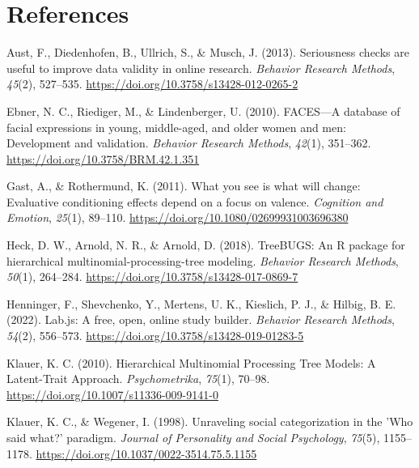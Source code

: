 \documentclass[
  doc,floatsintext]{apa6}
\newlength{\cslhangindent}
\newenvironment{CSLReferences}[2] %
 {\begin{list}{}{%
  \setlength{\itemindent}{0pt}
  \setlength{\leftmargin}{0pt}
  \setlength{\parsep}{0pt}
  \ifodd #1
   \setlength{\leftmargin}{\cslhangindent}
   \setlength{\itemindent}{-1\cslhangindent}
  \fi
  \setlength{\itemsep}{#2\baselineskip}}}
 {\end{list}}
\begin{document}
\section{References}\label{references}

\label{refs}
\begin{CSLReferences}{1}{0}
Aust, F., Diedenhofen, B., Ullrich, S., \& Musch, J. (2013). Seriousness checks are useful to improve data validity in online research. \emph{Behavior Research Methods}, \emph{45}(2), 527--535. \url{https://doi.org/10.3758/s13428-012-0265-2}

Ebner, N. C., Riediger, M., \& Lindenberger, U. (2010). {FACES}---{A} database of facial expressions in young, middle-aged, and older women and men: {Development} and validation. \emph{Behavior Research Methods}, \emph{42}(1), 351--362. \url{https://doi.org/10.3758/BRM.42.1.351}

Gast, A., \& Rothermund, K. (2011). What you see is what will change: {Evaluative} conditioning effects depend on a focus on valence. \emph{Cognition and Emotion}, \emph{25}(1), 89--110. \url{https://doi.org/10.1080/02699931003696380}

Heck, D. W., Arnold, N. R., \& Arnold, D. (2018). {TreeBUGS}: {An R} package for hierarchical multinomial-processing-tree modeling. \emph{Behavior Research Methods}, \emph{50}(1), 264--284. \url{https://doi.org/10.3758/s13428-017-0869-7}

Henninger, F., Shevchenko, Y., Mertens, U. K., Kieslich, P. J., \& Hilbig, B. E. (2022). Lab.js: {A} free, open, online study builder. \emph{Behavior Research Methods}, \emph{54}(2), 556--573. \url{https://doi.org/10.3758/s13428-019-01283-5}

Klauer, K. C. (2010). Hierarchical {Multinomial Processing Tree Models}: {A Latent-Trait Approach}. \emph{Psychometrika}, \emph{75}(1), 70--98. \url{https://doi.org/10.1007/s11336-009-9141-0}

Klauer, K. C., \& Wegener, I. (1998). Unraveling social categorization in the '{Who} said what?' paradigm. \emph{Journal of Personality and Social Psychology}, \emph{75}(5), 1155--1178. \url{https://doi.org/10.1037/0022-3514.75.5.1155}


\end{CSLReferences}
\end{document}

